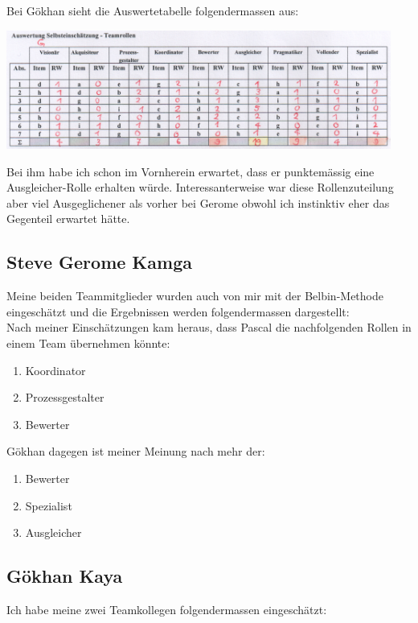 Bei Gökhan sieht die Auswertetabelle folgendermassen aus:

\includegraphics[height=39mm]{images/FremdeinschaetzungHoratKaya.png}

Bei ihm habe ich schon im Vornherein erwartet, dass er punktemässig eine Ausgleicher-Rolle erhalten würde. Interessanterweise war diese Rollenzuteilung aber viel Ausgeglichener als vorher bei Gerome obwohl ich instinktiv eher das Gegenteil erwartet hätte. 

\subsection*{Steve Gerome Kamga}

Meine beiden Teammitglieder wurden auch von mir mit der Belbin-Methode eingeschätzt und die Ergebnissen werden folgendermassen dargestellt: \\
Nach meiner Einschätzungen kam heraus, dass Pascal die nachfolgenden Rollen in einem Team übernehmen könnte:
\begin{enumerate}
\item Koordinator
\item Prozessgestalter
\item Bewerter
\end{enumerate}


Gökhan dagegen ist meiner Meinung nach mehr der: \\
\begin{enumerate}
\item Bewerter
\item Spezialist
\item Ausgleicher
\end{enumerate}


\subsection*{Gökhan Kaya}

Ich habe meine zwei Teamkollegen folgendermassen eingeschätzt:\\

